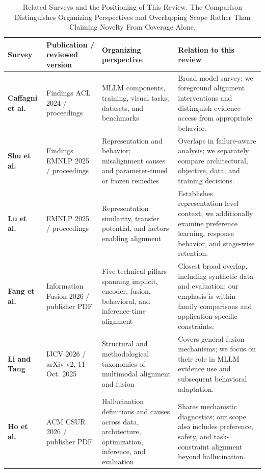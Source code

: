 \begin{table}[t]
\centering
\caption{Related Surveys and the Positioning of This Review. The Comparison Distinguishes Organizing Perspectives and Overlapping Scope Rather Than Claiming Novelty From Coverage Alone.}
\label{tab:survey-positioning}
\footnotesize
\setlength{\tabcolsep}{4pt}
\renewcommand{\arraystretch}{1.16}
\begin{tabularx}{\textwidth}{>{\raggedright\arraybackslash}p{}>{\raggedright\arraybackslash}p{}>{\raggedright\arraybackslash}X>{\raggedright\arraybackslash}X}
\toprule
\rowcolor{surveyheader}
\textbf{Survey} & \textbf{Publication / reviewed version} & \textbf{Organizing perspective} & \textbf{Relation to this review} \\
\midrule
\textbf{Caffagni et al.}~\cite{caffagni2024revolution} & Findings ACL 2024 / proceedings & MLLM components, training, visual tasks, datasets, and benchmarks & Broad model survey; we foreground alignment interventions and distinguish evidence access from appropriate behavior. \\
\textbf{Shu et al.}~\cite{shu2025alignmentexplainability} & Findings EMNLP 2025 / proceedings & Representation and behavior; misalignment causes and parameter-tuned or frozen remedies & Overlaps in failure-aware analysis; we separately compare architectural, objective, data, and training decisions. \\
\textbf{Lu et al.}~\cite{lu2025representationpotentials} & EMNLP 2025 / proceedings & Representation similarity, transfer potential, and factors enabling alignment & Establishes representation-level context; we additionally examine preference learning, response behavior, and stage-wise retention. \\
\textbf{Fang et al.}~\cite{fang2026alignmentsurvey} & Information Fusion 2026 / publisher PDF & Five technical pillars spanning implicit, encoder, fusion, behavioral, and inference-time alignment & Closest broad overlap, including synthetic data and evaluation; our emphasis is within-family comparisons and application-specific constraints. \\
\textbf{Li and Tang}~\cite{li2024alignmentfusion} & IJCV 2026 / arXiv v2, 11 Oct. 2025 & Structural and methodological taxonomies of multimodal alignment and fusion & Covers general fusion mechanisms; we focus on their role in MLLM evidence use and subsequent behavioral adaptation. \\
\textbf{Ho et al.}~\cite{ho2026hallucinationunderstanding} & ACM CSUR 2026 / publisher PDF & Hallucination definitions and causes across data, architecture, optimization, inference, and evaluation & Shares mechanistic diagnostics; our scope also includes preference, safety, and task-constraint alignment beyond hallucination. \\

\end{tabularx}
\end{table}
